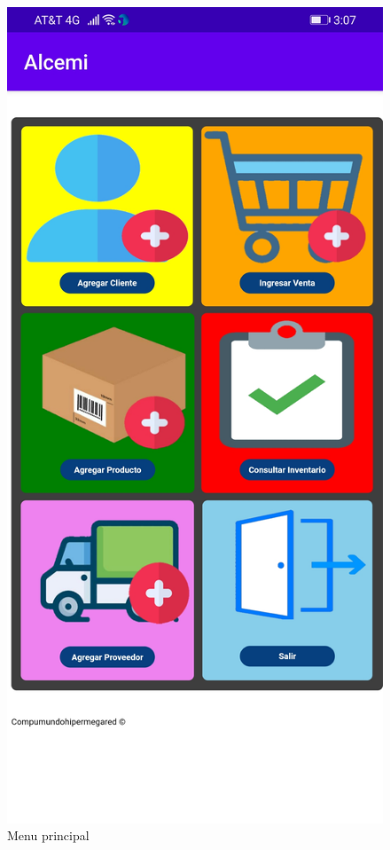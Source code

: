\documentclass{article}
\begin{document}
\pagebreak

\begin{figure}[h]
\begin{minipage}[t]{0.5\linewidth}
\caption {Menu principal}
\centering
\includegraphics[scale=0.16]{fig12}

\end{minipage}
\end{figure}
\end{document}
